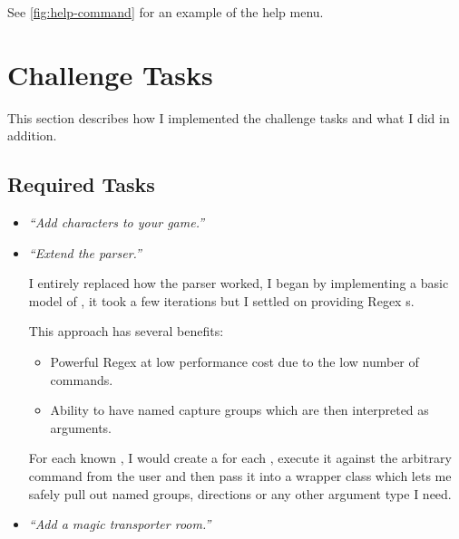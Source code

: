 \documentclass{article}
\begin{document}
\begin{multicols}{2}
\begin{itemize}[leftmargin=*]
                    See \autoref{fig:help-command} for an example of the help menu.
            \end{itemize}

        \section{Challenge Tasks}

            This section describes how I implemented the challenge tasks and what I did in addition.

            \subsection{Required Tasks}
            \begin{itemize}[leftmargin=*]
                \item \textit{``Add characters to your game.''}
                

                \item \textit{``Extend the parser.''}
                
                    I entirely replaced how the parser worked, I began by implementing a basic model of , it took a few iterations but I settled on providing Regex s.

                    This approach has several benefits:

                    \begin{itemize}[leftmargin=*]
                        \item Powerful Regex at low performance cost due to the low number of commands.
                        \item Ability to have named capture groups which are then interpreted as arguments.
                    \end{itemize}

                    For each known , I would create a  for each , execute it against the arbitrary command from the user and then pass it into a wrapper class  which lets me safely pull out named groups, directions or any other argument type I need.
                
                \item \textit{``Add a magic transporter room.''}
                

\end{itemize}
\end{multicols}
\end{document}
